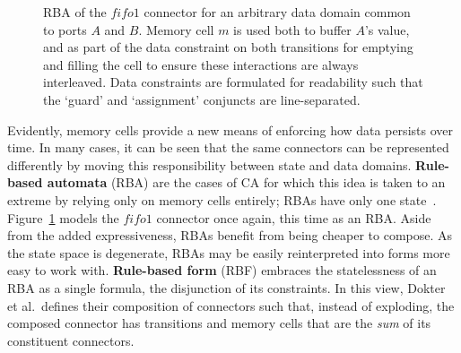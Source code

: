 \begin{figure}[ht]
	\centering
	\caption[RBA for fifo1 connector.]{RBA of the $fifo1$ connector for an arbitrary data domain common to ports $A$ and $B$. Memory cell $m$ is used both to buffer $A$'s value, and as part of the data constraint on both transitions for emptying and filling the cell to ensure these interactions are always interleaved. Data constraints are formulated for readability such that the `guard' and `assignment' conjuncts are line-separated.}
	\label{fig:fifo1_rba}
\end{figure}
Evidently, memory cells provide a new means of enforcing how data persists over time. In many cases, it can be seen that the same connectors can be represented differently by moving this responsibility between state and data domains. \textbf{Rule-based automata} (RBA) are the cases of CA for which this idea is taken to an extreme by relying only on memory cells entirely; RBAs have only one state~\cite{dokter2018rule}. Figure~\ref{fig:fifo1_rba} models the $fifo1$ connector once again, this time as an RBA. Aside from the added expressiveness, RBAs benefit from being cheaper to compose. As the state space is degenerate, RBAs may be easily reinterpreted into forms more easy to work with. \textbf{Rule-based form} (RBF) embraces the statelessness of an RBA as a single formula, the disjunction of its constraints. In this view, Dokter et al.\ defines their composition of connectors such that, instead of exploding, the composed connector has transitions and memory cells that are the \textit{sum} of its constituent connectors.




